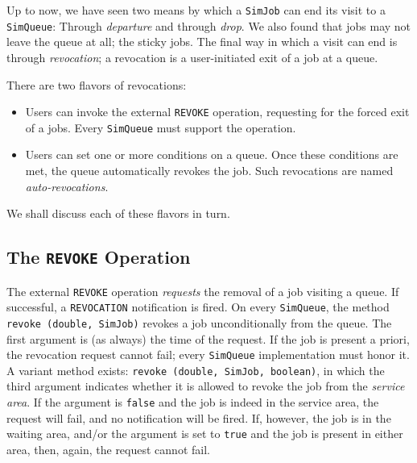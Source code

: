 \documentclass[12pt]{book}
\begin{document}
Up to now,
  we have seen two means by which a \lstinline|SimJob|
  can end its visit to a \lstinline|SimQueue|:
  Through {\em departure\/}
  and through {\em drop}.
We also found that jobs may not leave the queue at all;
  the sticky jobs.
The final way in which a visit can end is through {\em revocation};
  a revocation is a user-initiated exit of a job at a queue.

There are two flavors of revocations:
\begin{itemize}
\item
  Users can invoke the external \lstinline|REVOKE| operation,
    requesting for the forced exit of a jobs.
  Every \lstinline|SimQueue| must support the operation.
\item
  Users can set one or more conditions on a queue.
  Once these conditions are met, the queue automatically
    revokes the job.
  Such revocations are named {\em auto-revocations}.
\end{itemize}

We shall discuss each of these flavors in turn.

\subsection{The \texttt{REVOKE} Operation}

The external \lstinline|REVOKE| operation
  {\em requests\/} the removal of a job visiting a queue.
If successful,
  a \lstinline|REVOCATION| notification is fired.
On every \lstinline|SimQueue|,
  the method \lstinline|revoke (double, SimJob)|
  revokes a job unconditionally from the queue.
The first argument is (as always)
  the time of the request.
If the job is present a priori,
  the revocation request cannot fail;
  every \lstinline|SimQueue| implementation
  must honor it.
A variant method exists: \lstinline|revoke (double, SimJob, boolean)|,
  in which the third argument indicates
  whether it is allowed to revoke the job
  from the {\em service area}.
If the argument is \lstinline|false| and the job is indeed
  in the service area,
  the request will fail,
  and no notification will be fired.
If, however, the job is in the waiting area,
  and/or the argument is set to \lstinline|true|
  and the job is present in either area,
  then, again, the request cannot fail.
\end{document}
